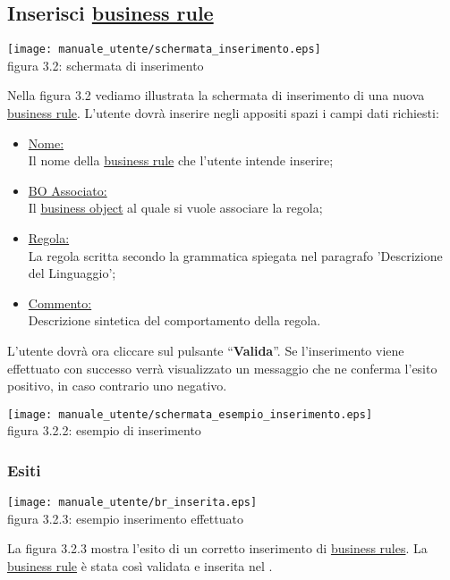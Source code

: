 \subsection{Inserisci \underline{business rule}}
\begin{center}
\texttt{[image: manuale\_utente/schermata\_inserimento.eps]}\\
 figura 3.2: schermata di inserimento
\end{center}
Nella figura 3.2 vediamo illustrata la schermata di inserimento di una nuova \underline{business rule}. L'utente dovr\`a inserire negli appositi spazi i campi dati richiesti:
\begin{itemize}
\item \underline{Nome:} \\
Il nome della \underline{business rule} che l'utente intende inserire;
\item \underline{BO Associato:} \\
Il \underline{business object} al quale si vuole associare la regola;
\item \underline{Regola:} \\
 La regola scritta secondo la grammatica spiegata nel paragrafo 'Descrizione del Linguaggio';
\item \underline{Commento:} \\
Descrizione sintetica del comportamento della regola. 
\end{itemize}
L'utente dovr\`a ora cliccare sul pulsante ``\textbf{Valida}''. Se l'inserimento viene effettuato con successo verr\`a visualizzato un messaggio che ne conferma l'esito positivo, in caso contrario uno negativo. 
\begin{center}
\texttt{[image: manuale\_utente/schermata\_esempio\_inserimento.eps]}\\
 figura 3.2.2: esempio di inserimento
\end{center} 
\subsubsection{Esiti}
\begin{center}
\texttt{[image: manuale\_utente/br\_inserita.eps]}\\
 figura 3.2.3: esempio inserimento effettuato
\end{center} 
La figura 3.2.3 mostra l'esito di un corretto inserimento di \underline{business rules}. La \underline{business rule} \`e stata cos\`i validata e inserita nel \rp.

